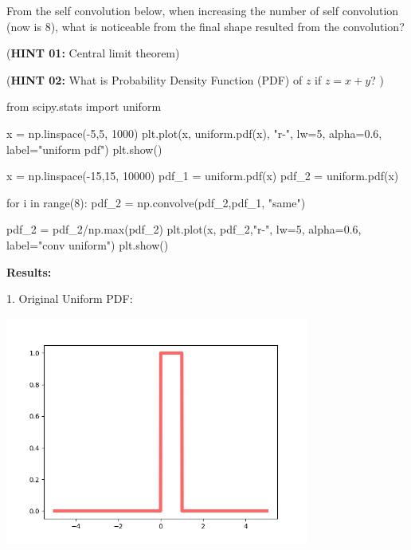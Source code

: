 \documentclass[a4paper, 10pt]{article}
\begin{document}
\newpage

\begin{subproblems}[start=2]
    \item From the self convolution below, when increasing the number of self convolution (now is 8),
    what is noticeable from the final shape resulted from the convolution?

    \vspace{2mm}

    (\textbf{HINT 01:} Central limit theorem)

    \vspace{2mm}

    (\textbf{HINT 02:} What is Probability Density Function (PDF) of \( z \) if \( z = x + y \)? )

    \begin{codingbox}
from scipy.stats import uniform

x = np.linspace(-5,5, 1000)
plt.plot(x, uniform.pdf(x), "r-", lw=5, alpha=0.6, label="uniform pdf")
plt.show()

x = np.linspace(-15,15, 10000)
pdf_1 = uniform.pdf(x)
pdf_2 = uniform.pdf(x)

for i in range(8):
    pdf_2 = np.convolve(pdf_2,pdf_1, "same")

pdf_2 = pdf_2/np.max(pdf_2)
plt.plot(x, pdf_2,"r-", lw=5, alpha=0.6, label="conv uniform")
plt.show()
    \end{codingbox}

    \par\noindent \textbf{Results:} \par\noindent \vspace{3mm}
    1. Original Uniform PDF:
    \begin{center}
        \includegraphics[width=0.75\textwidth]{images/problem_6_2_uniform_pdf.png}
    \end{center}


\end{subproblems}
\end{document}
